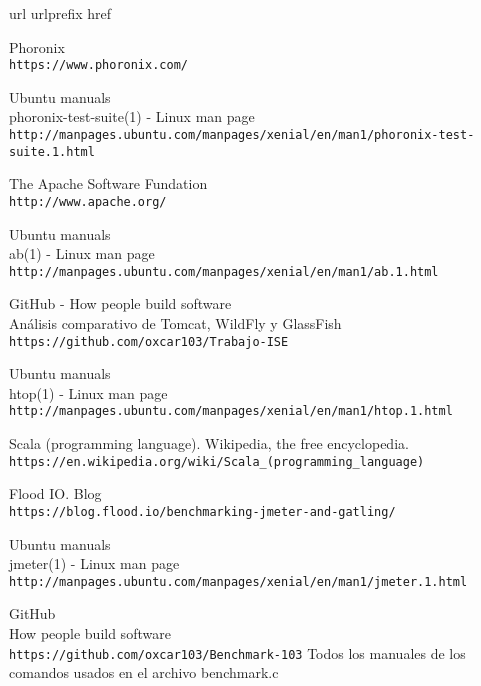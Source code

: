 \begin{thebibliography}{10}
\expandafter\ifx\csname url\endcsname\relax
  \def\url#1{\texttt{#1}}\fi
\expandafter\ifx\csname urlprefix\endcsname\relax\def\urlprefix{URL }\fi
\expandafter\ifx\csname href\endcsname\relax
  \def\href#1#2{#2} \def\path#1{#1}\fi

Phoronix\\
  \url{https://www.phoronix.com/}

Ubuntu manuals\\
phoronix-test-suite(1) - Linux man page\\
  \url{http://manpages.ubuntu.com/manpages/xenial/en/man1/phoronix-test-suite.1.html}

The Apache Software Fundation\\
  \url{http://www.apache.org/}

Ubuntu manuals\\
ab(1) - Linux man page\\
  \url{http://manpages.ubuntu.com/manpages/xenial/en/man1/ab.1.html}

GitHub - How people build software\\
Análisis comparativo de Tomcat, WildFly y GlassFish\\
  \url{https://github.com/oxcar103/Trabajo-ISE}

Ubuntu manuals\\
htop(1) - Linux man page\\
  \url{http://manpages.ubuntu.com/manpages/xenial/en/man1/htop.1.html}

Scala (programming language). Wikipedia, the free encyclopedia.\\
  \url{https://en.wikipedia.org/wiki/Scala_(programming_language)}

Flood IO. Blog\\
  \url{https://blog.flood.io/benchmarking-jmeter-and-gatling/}

Ubuntu manuals\\
jmeter(1) - Linux man page\\
  \url{http://manpages.ubuntu.com/manpages/xenial/en/man1/jmeter.1.html}

GitHub\\
How people build software\\
  \url{https://github.com/oxcar103/Benchmark-103}
Todos los manuales de los comandos usados en el archivo benchmark.c

\end{thebibliography}
